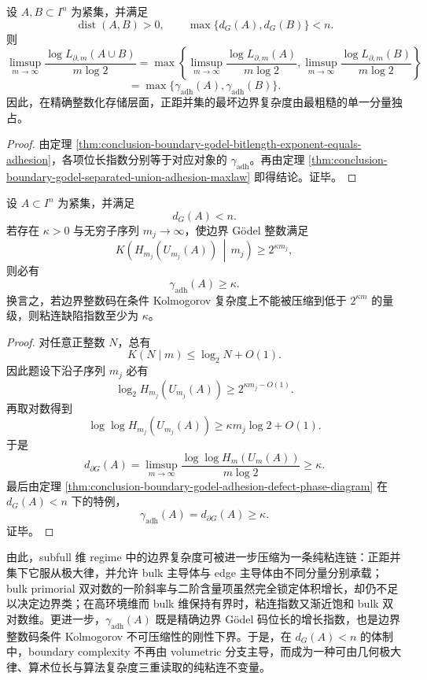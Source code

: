 \begin{corollary}[正距并集的精确边界存储由最粗糙分量单独决定]\label{cor:conclusion-boundary-godel-separated-union-storage-maxlaw}
设 \(A,B\subset I^n\) 为紧集，并满足
\[
\operatorname{dist}(A,B)>0,
\qquad
\max\{d_G(A),d_G(B)\}<n.
\]
则
\[
\limsup_{m\to\infty}\frac{\log L_{\partial,m}(A\cup B)}{m\log 2}
=
\max\left\{
\limsup_{m\to\infty}\frac{\log L_{\partial,m}(A)}{m\log 2},
\limsup_{m\to\infty}\frac{\log L_{\partial,m}(B)}{m\log 2}
\right\}
\]
\[
=
\max\{\gamma_{\mathrm{adh}}(A),\gamma_{\mathrm{adh}}(B)\}.
\]
因此，在精确整数化存储层面，正距并集的最坏边界复杂度由最粗糙的单一分量独占。
\end{corollary}
\begin{proof}
由定理 \ref{thm:conclusion-boundary-godel-bitlength-exponent-equals-adhesion}，各项位长指数分别等于对应对象的 \(\gamma_{\mathrm{adh}}\)。再由定理 \ref{thm:conclusion-boundary-godel-separated-union-adhesion-maxlaw} 即得结论。证毕。
\end{proof}

\begin{theorem}\label{thm:conclusion-boundary-godel-kolmogorov-lowerbound-forces-adhesion}
设 \(A\subset I^n\) 为紧集，并满足
\[
d_G(A)<n.
\]
若存在 \(\kappa>0\) 与无穷子序列 \(m_j\to\infty\)，使边界 Gödel 整数满足
\[
K\!\left(H_{m_j}(U_{m_j}(A))\,\middle|\,m_j\right)\ge 2^{\kappa m_j},
\]
则必有
\[
\gamma_{\mathrm{adh}}(A)\ge \kappa.
\]
换言之，若边界整数码在条件 Kolmogorov 复杂度上不能被压缩到低于 \(2^{\kappa m}\) 的量级，则粘连缺陷指数至少为 \(\kappa\)。
\end{theorem}
\begin{proof}
对任意正整数 \(N\)，总有
\[
K(N\mid m)\le \log_2 N+O(1).
\]
因此题设下沿子序列 \(m_j\) 必有
\[
\log_2 H_{m_j}(U_{m_j}(A))\ge 2^{\kappa m_j-O(1)}.
\]
再取对数得到
\[
\log\log H_{m_j}(U_{m_j}(A))
\ge \kappa m_j\log 2+O(1).
\]
于是
\[
d_{\partial G}(A)
=
\limsup_{m\to\infty}\frac{\log\log H_m(U_m(A))}{m\log 2}
\ge \kappa.
\]
最后由定理 \ref{thm:conclusion-boundary-godel-adhesion-defect-phase-diagram} 在 \(d_G(A)<n\) 下的特例，
\[
\gamma_{\mathrm{adh}}(A)=d_{\partial G}(A)\ge \kappa.
\]
证毕。
\end{proof}

\noindent
由此，subfull 维 regime 中的边界复杂度可被进一步压缩为一条纯粘连链：正距并集下它服从极大律，并允许 bulk 主导体与 edge 主导体由不同分量分别承载；bulk primorial 双对数的一阶斜率与二阶含量项虽然完全锁定体积增长，却仍不足以决定边界类；在高环境维而 bulk 维保持有界时，粘连指数又渐近饱和 bulk 双对数维。更进一步，\(\gamma_{\mathrm{adh}}(A)\) 既是精确边界 Gödel 码位长的增长指数，也是边界整数码条件 Kolmogorov 不可压缩性的刚性下界。于是，在 \(d_G(A)<n\) 的体制中，boundary complexity 不再由 volumetric 分支主导，而成为一种可由几何极大律、算术位长与算法复杂度三重读取的纯粘连不变量。

\endinput
